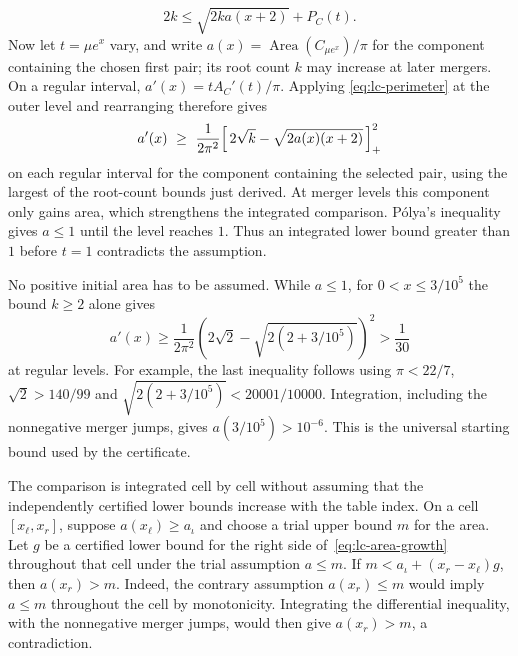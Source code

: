 \documentclass[11pt]{article}
\begin{document}
\[
 2k\le\sqrt{2ka(x+2)}+P_C(t).
\]
Now let $t=\mu e^x$ vary, and write
$a(x)=\operatorname{Area}(C_{\mu e^x})/\pi$ for the component containing
the chosen first pair; its root count $k$ may increase at later mergers.
On a regular interval, $a'(x)=tA_C'(t)/\pi$. Applying
\eqref{eq:lc-perimeter} at the outer level and rearranging therefore gives
\begin{equation}\label{eq:lc-area-growth}
 a'(x)\ \ge\ \frac1{2\pi^2}
 \Bigl[\,2\sqrt k-\sqrt{2a(x)(x+2)}\,\Bigr]_{+}^{2}
\end{equation}
on each regular interval for the component containing the selected pair,
using the largest of the root-count bounds just derived. At merger levels
this component only gains
area, which strengthens the integrated comparison. P\'olya's inequality
gives $a\le1$ until the level reaches $1$. Thus an integrated lower bound
greater than $1$ before $t=1$ contradicts the assumption.

No positive initial area has to be assumed. While $a\le1$, for
$0<x\le3/10^5$ the bound $k\ge2$ alone gives
\[
 a'(x)\ge\frac1{2\pi^2}
 \left(2\sqrt2-\sqrt{2(2+3/10^5)}\right)^2>\frac1{30}
\]
at regular levels. For example, the last inequality follows using
$\pi<22/7$, $\sqrt2>140/99$ and
$\sqrt{2(2+3/10^5)}<20001/10000$. Integration, including the
nonnegative merger jumps, gives $a(3/10^5)>10^{-6}$. This is the
universal starting bound used by the certificate.

The comparison is integrated cell by cell without assuming that the
independently certified lower bounds increase with the table index.
On a cell $[x_\ell,x_r]$, suppose $a(x_\ell)\ge a_\iota$ and choose
a trial upper bound $m$ for the area. Let $g$ be a certified lower bound
for the right side of~\eqref{eq:lc-area-growth} throughout that cell
under the trial assumption $a\le m$. If
$m<a_\iota+(x_r-x_\ell)g$, then $a(x_r)>m$. Indeed, the contrary
assumption $a(x_r)\le m$ would imply $a\le m$ throughout the cell by
monotonicity. Integrating the differential inequality, with the
nonnegative merger jumps, would then give $a(x_r)>m$, a contradiction.
\end{document}
